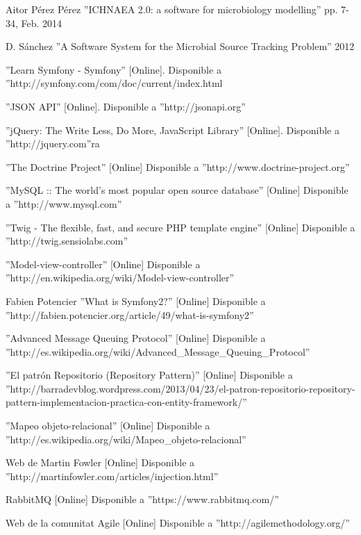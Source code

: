 
\begin{thebibliography}{100}
Aitor P\'{e}rez P\'{e}rez ''ICHNAEA 2.0: a software for microbiology modelling'' pp. 7-34, Feb. 2014

D. S\'{a}nchez ''A Software System for the Microbial Source Tracking Problem'' 2012

 ''Learn Symfony - Symfony'' [Online]. Disponible a ''http://symfony.com/com/doc/current/index.html

 ''JSON API''  [Online]. Disponible a ''http://jsonapi.org''

 ''jQuery: The Write Less, Do More, JavaScript Library'' [Online]. Disponible a ''http://jquery.com''ra

 ''The Doctrine Project'' [Online] Disponible a ''http://www.doctrine-project.org''

 ''MySQL :: The world's most popular open source database'' [Online] Disponible a ''http://www.mysql.com''

 ''Twig - The flexible, fast, and secure PHP template engine''  [Online] Disponible a ''http://twig.sensiolabs.com''

 ''Model-view-controller'' [Online] Disponible a ''http://en.wikipedia.org/wiki/Model-view-controller''

 Fabien Potencier ''What is Symfony2?'' [Online] Disponible a  ''http://fabien.potencier.org/article/49/what-is-symfony2''

 ''Advanced Message Queuing Protocol'' [Online] Disponible a ''http://es.wikipedia.org/wiki/Advanced\_Message\_Queuing\_Protocol''

 ''El patr\'{o}n Repositorio (Repository Pattern)'' [Online] Disponible a  ''http://barradevblog.wordpress.com/2013/04/23/el-patron-repositorio-repository-pattern-implementacion-practica-con-entity-framework/''

 ''Mapeo objeto-relacional'' [Online] Disponible a ''http://es.wikipedia.org/wiki/Mapeo\_objeto-relacional''

 Web de Martin Fowler [Online] Disponible a ''http://martinfowler.com/articles/injection.html''

 RabbitMQ [Online] Disponible a ''https://www.rabbitmq.com/''

 Web de la comunitat Agile [Online] Disponible a ''http://agilemethodology.org/''


\end{thebibliography}
